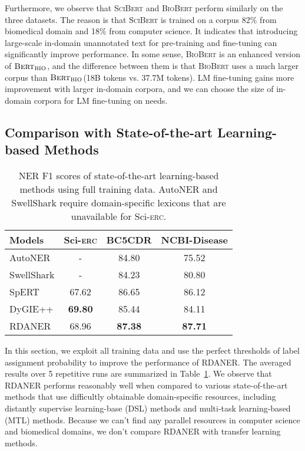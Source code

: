 \documentclass[10pt, conference, compsocconf]{IEEEtran}
\newcommand{\bert}{\textsc{Bert}\xspace}
\newcommand{\scibert}{\textsc{SciBert}\xspace}
\newcommand{\biobert}{\textsc{BioBert}\xspace}
\newcommand{\Scierc}{\textsc{S}ci-\textsc{erc}\xspace}
\newcommand{\rdaner}{\textsc{RDANER}\xspace}
\newcommand{\bertbio}{$\bert_{\textsc{BIO}}$\xspace}
\newcommand{\bertbase}{$\bert_{\textsc{Base}}$\xspace}
\begin{document}
Furthermore, we observe that \scibert and \biobert perform similarly on the three datasets. 
The reason is that \scibert is trained on a corpus 82\% from biomedical domain and 18\% from computer science.
It indicates that introducing large-scale in-domain unannotated text for pre-training and fine-tuning
can significantly improve performance. 
In some sense, \biobert is an enhanced version of \bertbio , and the difference between them
is that \biobert uses a much larger corpus than \bertbio (18B tokens vs. 37.7M tokens).
LM fine-tuning gains more improvement with larger in-domain corpora, and we can 
choose the size of in-domain corpora for LM fine-tuning on needs.


\subsection{Comparison with State-of-the-art Learning-based Methods}
\begin{table}[t]
    \caption{NER F1 scores of state-of-the-art learning-based methods using full training data.
    AutoNER and SwellShark require domain-specific lexicons that are unavailable for \Scierc.}
    \label{tal:sota}
    \centering
	\begin{tabular}{lccc}
		\toprule
        Models & \Scierc & BC5CDR  & NCBI-Disease \\
        \hline
        AutoNER\cite{shang-etal-2018-learning} & - & 84.80 & 75.52 \\ 
        SwellShark\cite{fries2017swellshark} & - & 84.23 & 80.80 \\ 
        \hline
        SpERT\cite{eberts2019span} & 67.62 &86.65  & 86.12 \\ 
        DyGIE++\cite{wadden-etal-2019-entity} & \textbf{69.80} & 85.44 & 84.11 \\ 
        \hline
        \rdaner & 68.96 &  \textbf{87.38} &  \textbf{87.71} \\ 
		\bottomrule
    \end{tabular}
\end{table}
In this section, we exploit all training data and use the perfect thresholds of label assignment probability to 
improve the performance of \rdaner.
The averaged results over 5 repetitive runs are summarized in Table~\ref{tal:sota}.
We observe that \rdaner performs reasonably well when compared to various state-of-the-art methods
that use difficultly obtainable domain-specific resources, including distantly supervise learning-base (DSL) methods and
multi-task learning-based (MTL) methods. Because we can't find any parallel 
resources in computer science and biomedical domains, we don't compare
\rdaner with transfer learning methods. 
\end{document}
